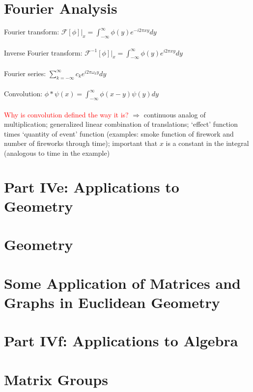 \documentclass[a4paper]{article}
\newcommand{\followup}[1]{\textcolor{red}{ #1 }}
\begin{document}
\section{Fourier Analysis}
Fourier transform:
$\mathcal{F} [\phi]|_x = \int_{-\infty}^{\infty} \phi (y) e^{-i2\pi xy}dy$
\\~\\
Inverse Fourier transform:
$\mathcal{F}^{-1} [\phi]|_x = \int_{-\infty}^{\infty} \phi(y) e^{i2\pi xy}dy$
\\~\\
Fourier series:
$\sum\limits_{k=-\infty}^{\infty} c_k e^{i2\pi \omega_k y}dy$
\\~\\
Convolution:
$\phi * \psi (x) = \int_{-\infty}^{\infty} \phi (x-y) \psi (y) dy$
\\~\\
\followup{Why is convolution defined the way it is?} $\Rightarrow$ continuous analog of multiplication; generalized linear combination of translations;
`effect' function times `quantity of event' function (examples: smoke function of firework and number of fireworks through time); important that $x$ is a constant in the integral (analogous to time in the example)
\newpage
\section*{Part IVe: Applications to Geometry}

\section{Geometry}

\section{Some Application of Matrices and Graphs in Euclidean Geometry}

\section*{Part IVf: Applications to Algebra}

\section{Matrix Groups}
\end{document}
